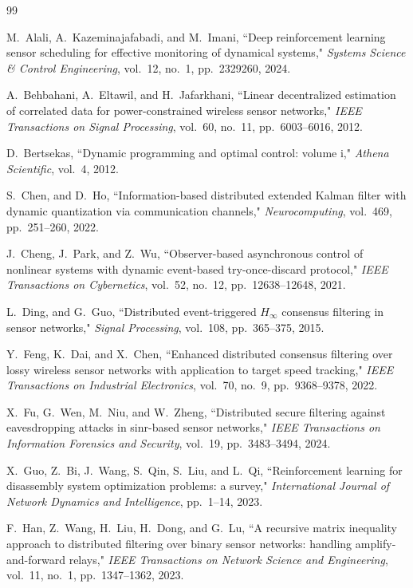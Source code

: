 \documentclass[twocolumn]{IEEEtran}
\begin{document}
\begin{thebibliography}{99}

M.~Alali, A.~Kazeminajafabadi, and M.~Imani, ``Deep reinforcement learning sensor scheduling for effective monitoring of dynamical systems," \textit{Systems Science \& Control Engineering}, vol.~12, no.~1, pp.~2329260, 2024.

A.~Behbahani, A.~Eltawil, and H.~Jafarkhani, ``Linear decentralized estimation of correlated data for power-constrained wireless sensor networks," \textit{IEEE Transactions on Signal Processing}, vol.~60, no.~11, pp.~6003--6016, 2012.

D.~Bertsekas, ``Dynamic programming and optimal control: volume i," \textit{Athena Scientific}, vol.~4, 2012.

S.~Chen, and D.~Ho, ``Information-based distributed extended Kalman filter with dynamic quantization via communication channels," \textit{Neurocomputing}, vol.~469, pp.~251--260, 2022.

J.~Cheng, J.~Park, and Z.~Wu, ``Observer-based asynchronous control of nonlinear systems with dynamic event-based try-once-discard protocol," \textit{IEEE Transactions on Cybernetics}, vol.~52, no.~12, pp.~12638--12648, 2021.

L.~Ding, and G.~Guo, ``Distributed event-triggered $H_{\infty}$ consensus filtering in sensor networks," \textit{Signal Processing}, vol.~108, pp.~365--375, 2015.

Y.~Feng, K.~Dai, and X.~Chen, ``Enhanced distributed consensus filtering over lossy wireless sensor networks with application to target speed tracking," \textit{IEEE Transactions on Industrial Electronics}, vol.~70, no.~9, pp.~9368--9378, 2022.

X.~Fu, G.~Wen, M.~Niu, and W.~Zheng, ``Distributed secure filtering against eavesdropping attacks in sinr-based sensor networks," \textit{IEEE Transactions on Information Forensics and Security}, vol.~19, pp.~3483--3494, 2024.

X.~Guo, Z.~Bi, J.~Wang, S.~Qin, S.~Liu, and L.~Qi, ``Reinforcement learning for disassembly system optimization problems: a survey," \textit{International Journal of Network Dynamics and Intelligence}, pp.~1--14, 2023.

F.~Han, Z.~Wang, H.~Liu, H.~Dong, and G.~Lu, ``A recursive matrix inequality approach to distributed filtering over binary sensor networks: handling amplify-and-forward relays," \textit{IEEE Transactions on Network Science and Engineering}, vol.~11, no.~1, pp.~1347--1362, 2023.


\end{thebibliography}
\end{document}
